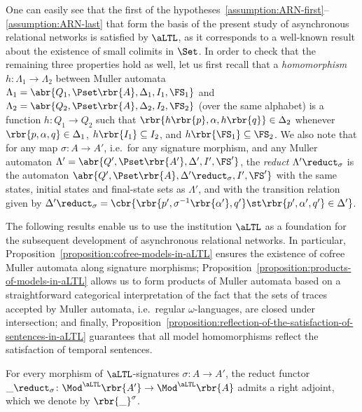\documentclass{LMCS}
\begin{document}
One can easily see that the first of the hypotheses~\ref{assumption:ARN-first}--\ref{assumption:ARN-last} that form the basis of the present study of asynchronous relational networks is satisfied by \(\aLTL\), as it corresponds to a well-known result about the existence of small colimits in \(\Set\).
In order to check that the remaining three properties hold as well, let us first recall that a \emph{homomorphism} \(h \colon \Lambda_{1} \to \Lambda_{2}\) between Muller automata \(\Lambda_{1} = \abr{Q_{1}, \Pset\rbr{A}, \Delta_{1}, I_{1}, \FS_{1}}\) and \(\Lambda_{2} = \abr{Q_{2}, \Pset\rbr{A}, \Delta_{2}, I_{2}, \FS_{2}}\) (over the same alphabet) is a function \(h \colon Q_{1} \to Q_{2}\) such that \(\rbr{h\rbr{p}, \alpha, h\rbr{q}} \in \Delta_{2}\) whenever \(\rbr{p, \alpha, q} \in \Delta_{1}\), \(h\rbr{I_{1}} \subseteq I_{2}\), and \(h\rbr{\FS_{1}} \subseteq \FS_{2}\).
We also note that for any map \(\sigma \colon A \to A'\), i.e.\ for any signature morphism, and any Muller automaton \(\Lambda' = \abr{Q', \Pset\rbr{A'}, \Delta', I', \FS'}\), the \emph{reduct} \(\Lambda' \reduct_{\sigma}\) is the automaton \(\abr{Q', \Pset\rbr{A}, \Delta' \reduct_{\sigma}, I', \FS'}\) with the same states, initial states and final-state sets as \(\Lambda'\), and with the transition relation given by \(\Delta' \reduct_{\sigma} = \cbr{\rbr{p', \sigma^{-1}\rbr{\alpha'}, q'} \st \rbr{p', \alpha', q'} \in \Delta'}\).

The following results enable us to use the institution \(\aLTL\) as a foundation for the subsequent development of asynchronous relational networks.
In particular, Proposition~\ref{proposition:cofree-models-in-aLTL} ensures the existence of cofree Muller automata along signature morphisms; Proposition~\ref{proposition:products-of-models-in-aLTL} allows us to form products of Muller automata based on a straightforward categorical interpretation of the fact that the sets of traces accepted by Muller automata, i.e.\ regular \(\omega\)\nb-languages, are closed under intersection; and finally, Proposition~\ref{proposition:reflection-of-the-satisfaction-of-sentences-in-aLTL} guarantees that all model homomorphisms reflect the satisfaction of temporal sentences.

\begin{prop}
  \label{proposition:cofree-models-in-aLTL}
  For every morphism of \(\aLTL\)\nb-signatures \(\sigma \colon A \to A'\), the reduct functor \(\_ \reduct_{\sigma} \colon \Mod^{\aLTL}\rbr{A'} \to \Mod^{\aLTL}\rbr{A}\) admits a right adjoint, which we denote by \(\rbr{\_}^{\sigma}\).
\end{prop}
\end{document}
